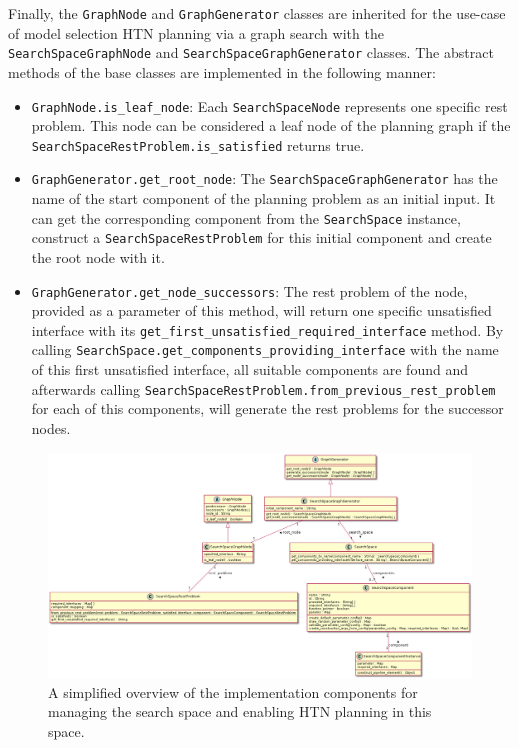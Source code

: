 Finally, the \texttt{GraphNode} and \texttt{GraphGenerator} classes are inherited for the use-case of model selection HTN planning via a graph search with the \texttt{SearchSpaceGraphNode} and \texttt{SearchSpaceGraphGenerator} classes.
The abstract methods of the base classes are implemented in the following manner:
\begin{itemize}
    \item \texttt{GraphNode.is\_leaf\_node}: Each \texttt{SearchSpaceNode} represents one specific rest problem.
    This node can be considered a leaf node of the planning graph if the \texttt{SearchSpaceRestProblem.is\_satisfied} returns true.
    \item \texttt{GraphGenerator.get\_root\_node}: The \texttt{SearchSpaceGraphGenerator} has the name of the start component of the planning problem as an initial input.
    It can get the corresponding component from the \texttt{SearchSpace} instance, construct a \texttt{SearchSpaceRestProblem} for this initial component and create the root node with it.
    \item \texttt{GraphGenerator.get\_node\_successors}: The rest problem of the node, provided as a parameter of this method, will return one specific unsatisfied interface with its \texttt{get\_first\_unsatisfied\_required\_interface} method.
    By calling \texttt{SearchSpace.get\_components\_providing\_interface} with the name of this first unsatisfied interface, all suitable components are found and afterwards calling \texttt{SearchSpaceRestProblem.from\_previous\_rest\_problem} for each of this components, will generate the rest problems for the successor nodes.
\end{itemize}

\begin{figure}[ht!]
    \centering
    \includegraphics[angle=90,origin=c,width=\textwidth,height=0.7\textheight,keepaspectratio]{gfx/Figures/Implementation/search-space/SearchSpaceManagement.png}
    \caption{A simplified overview of the implementation components for managing the search space and enabling HTN planning in this space.}
    \label{fig:implementation:uml:search-space}
\end{figure}

